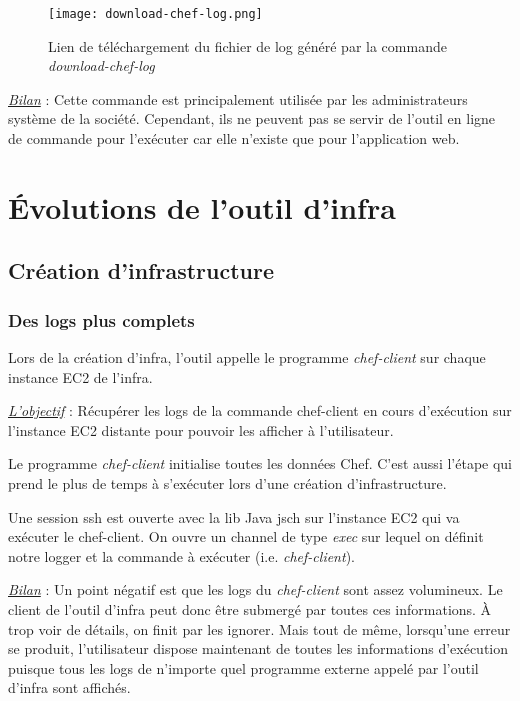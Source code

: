 \begin{figure}[H]
  \texttt{[image: download-chef-log.png]}
  \caption{Lien de téléchargement du fichier de log généré par la commande \textit{download-chef-log}}
\end{figure}

\underline{\textit{Bilan}} : Cette commande est principalement utilisée par les
administrateurs système de la société. Cependant, ils ne peuvent pas se servir
de l'outil en ligne de commande pour l'exécuter car elle n'existe que pour
l'application web.

\clearpage
\section{Évolutions de l'outil d'infra}

\subsection{Création d'infrastructure}

\subsubsection{Des logs plus complets}

Lors de la création d'infra, l'outil appelle le programme \textit{chef-client}
sur chaque instance EC2 de l'infra. 

\underline{\textit{L'objectif}} : Récupérer les logs de la commande chef-client
en cours d'exécution sur l'instance EC2 distante pour pouvoir les afficher à
l'utilisateur.

Le programme \textit{chef-client} initialise toutes les données Chef.
C'est aussi l'étape qui prend le plus de temps à s'exécuter lors d'une création
d'infrastructure.

Une session ssh est ouverte avec la lib Java jsch sur l'instance EC2 qui va
exécuter le chef-client. On ouvre un channel de type \textit{exec} sur lequel on
définit notre logger et la commande à exécuter (i.e. \textit{chef-client}).

\underline{\textit{Bilan}} : Un point négatif est que les logs du
\textit{chef-client} sont assez volumineux. Le client de l'outil d'infra 
peut donc être submergé par toutes ces informations. À trop voir de détails, on
finit par les ignorer. Mais tout de même, lorsqu'une erreur se produit,
l'utilisateur dispose maintenant de toutes les informations d'exécution puisque
tous les logs de n'importe quel programme externe appelé par l'outil d'infra
sont affichés.

